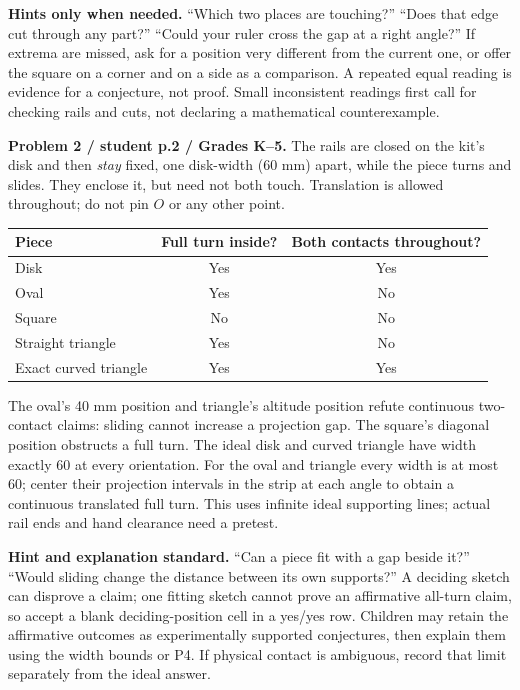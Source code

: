 \documentclass[11pt,letterpaper]{article}
\newcommand{\lead}[1]{\textbf{#1}}
\begin{document}
\lead{Hints only when needed.} ``Which two places are touching?'' ``Does that edge cut through any part?'' ``Could your ruler cross the gap at a right angle?'' If extrema are missed, ask for a position very different from the current one, or offer the square on a corner and on a side as a comparison. A repeated equal reading is evidence for a conjecture, not proof. Small inconsistent readings first call for checking rails and cuts, not declaring a mathematical counterexample.

\lead{Problem 2 / student p.2 / Grades K--5.} The rails are closed on the kit's disk and then \emph{stay} fixed, one disk-width (60 mm) apart, while the piece turns and slides. They enclose it, but need not both touch. Translation is allowed throughout; do not pin $O$ or any other point.
\begin{center}
\begin{tabular}{lcc}
\toprule Piece & Full turn inside? & Both contacts throughout?\\\midrule
Disk & Yes & Yes\\
Oval & Yes & No\\
Square & No & No\\
Straight triangle & Yes & No\\
Exact curved triangle & Yes & Yes\\\bottomrule
\end{tabular}
\end{center}
The oval's 40 mm position and triangle's altitude position refute continuous two-contact claims: sliding cannot increase a projection gap. The square's diagonal position obstructs a full turn. The ideal disk and curved triangle have width exactly 60 at every orientation. For the oval and triangle every width is at most 60; center their projection intervals in the strip at each angle to obtain a continuous translated full turn. This uses infinite ideal supporting lines; actual rail ends and hand clearance need a pretest.

\lead{Hint and explanation standard.} ``Can a piece fit with a gap beside it?'' ``Would sliding change the distance between its own supports?'' A deciding sketch can disprove a claim; one fitting sketch cannot prove an affirmative all-turn claim, so accept a blank deciding-position cell in a yes/yes row. Children may retain the affirmative outcomes as experimentally supported conjectures, then explain them using the width bounds or P4. If physical contact is ambiguous, record that limit separately from the ideal answer.
\end{document}
